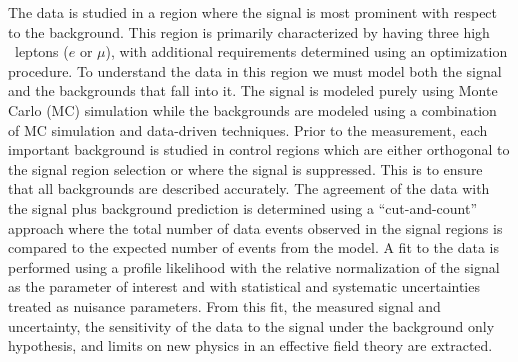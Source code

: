 The data is studied in a region where the signal is most prominent
with respect to the background.  This region is primarily characterized
by having three high \pt~leptons ($e$ or $\mu$), with additional
requirements determined using an optimization procedure.
To understand the data in this region we must model 
both the signal and the backgrounds that fall into it.
The signal is modeled purely using Monte Carlo (MC) simulation 
while the backgrounds are modeled using a combination of MC
simulation and data-driven techniques.
Prior to the measurement, each important background is 
studied in control regions
which are either orthogonal to the signal region selection
or where the signal is suppressed.  This is to ensure that all
backgrounds are described accurately. The agreement of the data 
with the signal plus background prediction is determined using 
a ``cut-and-count'' approach where the total number of data 
events observed in the signal regions is compared to the expected number
of events from the model.
A fit to the data is performed using a profile likelihood
with the relative normalization of the signal as 
the parameter of interest and with statistical and systematic 
uncertainties treated as nuisance parameters.
From this fit, the measured signal \xsec and uncertainty,
the sensitivity of the data to the signal 
under the background only hypothesis,
and limits on new physics in an effective field theory 
are extracted.



                                                                                


